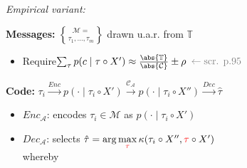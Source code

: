 \emph{Empirical variant:}

\textbf{Messages:}\enspace
$\mathcal M = \brace{ \tau_1, \ldots, \tau_m }$
drawn u.a.r. from $\mathbb T$
\begin{itemize}
    \item Require\enspace $\sum_\tau p(c\mid \tau\circ X') \approx \frac{\abs{\mathbb T}}{\abs{\mathcal C}} \pm \rho$\hfill
        $\color{gray} \leftarrow \text{scr. p.95}$
\end{itemize}
\vspace{-2pt}

\textbf{Code:}\enspace
$\tau_i \xrightarrow{Enc} p(\cdot\mid \tau_i \circ X')
\xrightarrow{\mathcal{C_A}} p(\cdot\mid \tau_i \circ X'')
\xrightarrow{Dec} \hat\tau$
\begin{itemize}
    \item $Enc_{\mathcal A}$:\enspace
        encodes $\tau_i \in \mathcal M$ as $p(\cdot\mid \tau_i \circ X')$
    \item $Dec_{\mathcal A}$:\enspace
        selects $\hat\tau = \arg\max\limits_{\color{red}\tau} \kappa(\tau_i \circ X'', {\color{red}\tau} \circ X')$\\
        whereby 
\end{itemize}

